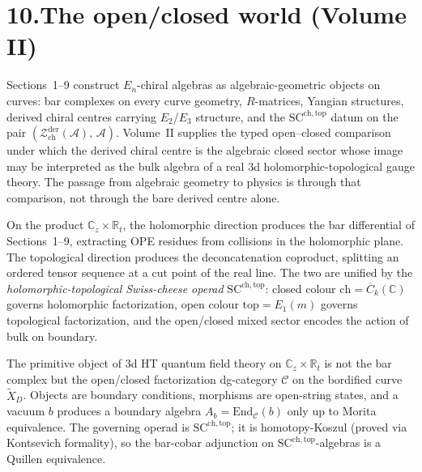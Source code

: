 \documentclass[11pt,reqno]{amsart}
\theoremstyle{definition}
\theoremstyle{remark}
\providecommand{\cA}{\mathcal{A}}
\providecommand{\cC}{\mathcal{C}}
\providecommand{\cZ}{\mathcal{Z}}
\providecommand{\FM}{\overline{C}}
\providecommand{\bC}{\mathbb{C}}
\providecommand{\bR}{\mathbb{R}}
\providecommand{\SCchtop}{\mathrm{SC}^{\mathrm{ch,top}}}
\providecommand{\End}{\mathrm{End}}
\providecommand{\der}{\mathrm{der}}
\providecommand{\ch}{\mathrm{ch}}
\numberwithin{equation}{section}
\begin{document}
\section*{10.\quad The open/closed world (Volume II)}

Sections~1--9 construct $E_n$-chiral algebras as
algebraic-geometric objects on curves: bar complexes on every
curve geometry, $R$-matrices, Yangian structures, derived chiral
centres carrying $E_2$/$E_3$ structure, and the
$\SCchtop$ datum on the pair
$(\cZ^{\der}_{\ch}(\cA),\, \cA)$. Volume~II supplies the typed
open--closed comparison under which the derived chiral centre is the
algebraic closed sector whose image may be interpreted as the bulk
algebra of a real $3$d holomorphic-topological gauge theory. The
passage from algebraic geometry to physics is through that comparison,
not through the bare derived centre alone.

On the product $\bC_z \times \bR_t$, the holomorphic direction
produces the bar differential of Sections~1--9, extracting OPE
residues from collisions in the holomorphic plane. The
topological direction produces the deconcatenation coproduct,
splitting an ordered tensor sequence at a cut point of the real
line. The two are unified by the \emph{holomorphic-topological
Swiss-cheese operad} $\SCchtop$: closed colour
$\mathrm{ch} = \FM_k(\bC)$ governs holomorphic factorization,
open colour $\mathrm{top} = E_1(m)$ governs topological
factorization, and the open/closed mixed sector encodes the
action of bulk on boundary.

The primitive object of 3d HT quantum field theory on
$\bC_z \times \bR_t$ is not the bar complex but the open/closed
factorization dg-category $\cC$ on the bordified curve
$\widetilde X_D$. Objects are boundary conditions, morphisms
are open-string states, and a vacuum $b$ produces a boundary
algebra $A_b = \End_\cC(b)$ only up to Morita equivalence. The
governing operad is $\SCchtop$; it is homotopy-Koszul (proved
via Kontsevich formality), so the bar-cobar adjunction on
$\SCchtop$-algebras is a Quillen equivalence.
\end{document}
